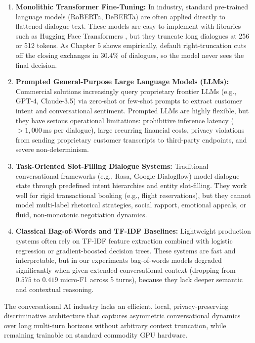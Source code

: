 \begin{enumerate}
  \item \textbf{Monolithic Transformer Fine-Tuning:} In industry, standard pre-trained language models (RoBERTa, DeBERTa) are often applied directly to flattened dialogue text. These models are easy to implement with libraries such as Hugging Face Transformers \cite{wolf2020transformers}, but they truncate long dialogues at 256 or 512 tokens. As Chapter 5 shows empirically, default right-truncation cuts off the closing exchanges in $30.4\%$ of dialogues, so the model never sees the final decision.
  \item \textbf{Prompted General-Purpose Large Language Models (LLMs):} Commercial solutions increasingly query proprietary frontier LLMs (e.g., GPT-4, Claude-3.5) via zero-shot or few-shot prompts to extract customer intent and conversational sentiment. Prompted LLMs are highly flexible, but they have serious operational limitations: prohibitive inference latency ($>1{,}000$\,ms per dialogue), large recurring financial costs, privacy violations from sending proprietary customer transcripts to third-party endpoints, and severe non-determinism.
  \item \textbf{Task-Oriented Slot-Filling Dialogue Systems:} Traditional conversational frameworks (e.g., Rasa, Google Dialogflow) model dialogue state through predefined intent hierarchies and entity slot-filling. They work well for rigid transactional booking (e.g., flight reservations), but they cannot model multi-label rhetorical strategies, social rapport, emotional appeals, or fluid, non-monotonic negotiation dynamics.
  \item \textbf{Classical Bag-of-Words and TF-IDF Baselines:} Lightweight production systems often rely on TF-IDF feature extraction combined with logistic regression or gradient-boosted decision trees. These systems are fast and interpretable, but in our experiments bag-of-words models degraded significantly when given extended conversational context (dropping from $0.575$ to $0.419$ micro-F1 across 5 turns), because they lack deeper semantic and contextual reasoning.
\end{enumerate}

\begin{keypoint}
The conversational AI industry lacks an efficient, local, privacy-preserving discriminative architecture that captures asymmetric conversational dynamics over long multi-turn horizons without arbitrary context truncation, while remaining trainable on standard commodity GPU hardware.
\end{keypoint}

